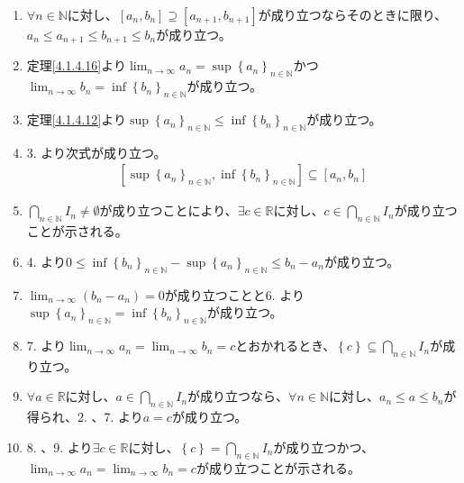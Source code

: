 \documentclass[dvipdfmx]{jsarticle}
\begin{document}
\begin{enumerate}
\def\labelenumi{\arabic{enumi}.}
\item
  $\forall n \in \mathbb{N}$に対し、$\left[ a_{n},b_{n} \right] \supseteq \left[ a_{n + 1},b_{n + 1} \right]$が成り立つならそのときに限り、$a_{n} \leq a_{n + 1} \leq b_{n + 1} \leq b_{n}$が成り立つ。
\item
  定理\ref{4.1.4.16}より$\lim_{n \rightarrow \infty}a_{n} = \sup\left\{ a_{n} \right\}_{n \in \mathbb{N}}$かつ$\lim_{n \rightarrow \infty}b_{n} = \inf\left\{ b_{n} \right\}_{n \in \mathbb{N}}$が成り立つ。
\item
  定理\ref{4.1.4.12}より$\sup\left\{ a_{n} \right\}_{n \in \mathbb{N}} \leq \inf\left\{ b_{n} \right\}_{n \in \mathbb{N}}$が成り立つ。
\item
  3. より次式が成り立つ。
\begin{align*}
\left[ {\sup\left\{ a_{n} \right\}}_{n \in \mathbb{N}},{\inf\left\{ b_{n} \right\}}_{n \in \mathbb{N}} \right] \subseteq \left[ a_{n},b_{n} \right]
\end{align*}
\item
  $\bigcap_{n \in \mathbb{N}}I_{n} \neq \emptyset$が成り立つことにより、$\exists c \in \mathbb{R}$に対し、$c \in \bigcap_{n \in \mathbb{N}}I_{n}$が成り立つことが示される。
\item
  4. より$0 \leq {\inf\left\{ b_{n} \right\}}_{n \in \mathbb{N}} - {\sup\left\{ a_{n} \right\}}_{n \in \mathbb{N}} \leq b_{n} - a_{n}$が成り立つ。
\item
  $\lim_{n \rightarrow \infty}\left( b_{n} - a_{n} \right) = 0$が成り立つことと6. より${\sup\left\{ a_{n} \right\}}_{n \in \mathbb{N}} = {\inf\left\{ b_{n} \right\}}_{n \in \mathbb{N}}$が成り立つ。
\item
  7. より$\lim_{n \rightarrow \infty}a_{n} = \lim_{n \rightarrow \infty}b_{n} = c$とおかれるとき、$\left\{ c \right\} \subseteq \bigcap_{n \in \mathbb{N}}I_{n}$が成り立つ。
\item
  $\forall a \in \mathbb{R}$に対し、$a \in \bigcap_{n \in \mathbb{N}}I_{n}$が成り立つなら、$\forall n \in \mathbb{N}$に対し、$a_{n} \leq a \leq b_{n}$が得られ、2. 、7. より$a = c$が成り立つ。
\item
  8. 、9. より$\exists c \in \mathbb{R}$に対し、$\left\{ c \right\} = \bigcap_{n \in \mathbb{N}}I_{n}$が成り立つかつ、$\lim_{n \rightarrow \infty}a_{n} = \lim_{n \rightarrow \infty}b_{n} = c$が成り立つことが示される。
\end{enumerate}
\end{document}
